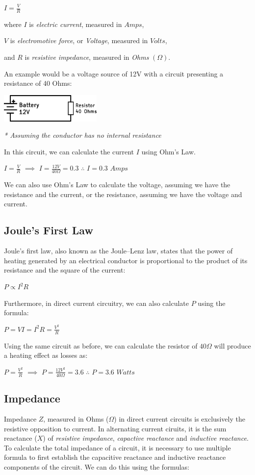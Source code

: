 \documentclass[11pt,a4paper]{article}
\begin{document}
$I = \frac{V}{R}$

where $I$ is \textit{electric current}, measured in $Amps$,

$V$ is \textit{electromotive force}, or \textit{Voltage}, measured in $Volts$,

and $R$ is \textit{resistive impedance}, measured in \textit{Ohms} $(\Omega)$.

An example would be a voltage source of 12V with a circuit presenting a resistance of 40 Ohms:

\begin{center}
\includegraphics[width=5cm]{SimpleResistive.png}\par
\textit{* Assuming the conductor has no internal resistance}
\end{center}
In this circuit, we can calculate the current $I$ using Ohm's Law.

$I = \frac{V}{R}$ $\implies$ $I = \frac{12 V}{40 \Omega} = 0.3$ $\therefore$ $I = 0.3$ $Amps$

We can also use Ohm's Law to calculate the voltage, assuming we have the resistance and the current, or the resistance, assuming we have the voltage and current.
\subsection{Joule's First Law}
Joule's first law, also known as the Joule–Lenz law, states that the power of heating generated by an electrical conductor is proportional to the product of its resistance and the square of the current:

$P \propto I^2 R$

Furthermore, in direct current circuitry, we can also calculate $P$ using the formula:

$P = V I = I^2 R = \frac{V^2}{R}$

Using the same circuit as before, we can calculate the resistor of $40 \Omega$ will produce a heating effect as losses as:

$P = \frac{V^2}{R}$ $\implies$ $P = \frac{12V^2}{40 \Omega} = 3.6$ $\therefore$ $P = 3.6$ $Watts$

\subsection{Impedance}
Impedance $Z$, measured in Ohms ($\Omega$) in direct current circuits is exclusively the resistive opposition to current. In alternating current ciruits, it is the sum reactance ($X$) of \textit{resistive impedance}, \textit{capactive reactance} and \textit{inductive reactance}. To calculate the total impedance of a circuit, it is necessary to use multiple formula to first establish the capacitive reactance and inductive reactance components of the circuit. We can do this using the formulas:
\end{document}
